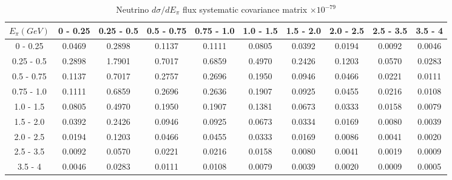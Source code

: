 \documentclass[aps,prl,twocolumn,showpacs,superscriptaddress,nofootinbib]{revtex4}
\begin{document}
\begingroup
\squeezetable
\begin{table}[h]
\tabcolsep=0.11cm
\begin{tabular}{c|ccccccccc}
$E_{\pi}(GeV)$ & 0 - 0.25 & 0.25 - 0.5 & 0.5 - 0.75 & 0.75 - 1.0 & 1.0 - 1.5 & 1.5 - 2.0 & 2.0 - 2.5 & 2.5 - 3.5 & 3.5 - 4 \\
\hline
0 - 0.25 &0.0469&	0.2898&	0.1137&	0.1111&	0.0805&	0.0392&	0.0194&	0.0092&	0.0046\\	
0.25 - 0.5& 0.2898&	1.7901&	0.7017&	0.6859&	0.4970&	0.2426&	0.1203&	0.0570&	0.0283	\\
0.5 - 0.75& 0.1137&	0.7017&	0.2757&	0.2696&	0.1950&	0.0946&	0.0466&	0.0221&	0.0111	\\
0.75 - 1.0& 0.1111&	0.6859&	0.2696&	0.2636&	0.1907&	0.0925&	0.0455&	0.0216&	0.0108	\\
1.0 - 1.5& 0.0805&	0.4970&	0.1950&	0.1907&	0.1381&	0.0673&	0.0333&	0.0158&	0.0079	\\
1.5 - 2.0& 0.0392&	0.2426&	0.0946&	0.0925&	0.0673&	0.0334&	0.0169&	0.0080&	0.0039	\\
2.0 - 2.5& 0.0194&	0.1203&	0.0466&	0.0455&	0.0333&	0.0169&	0.0086&	0.0041&	0.0020	\\
2.5 - 3.5& 0.0092&	0.0570&	0.0221&	0.0216&	0.0158&	0.0080&	0.0041&	0.0019&	0.0009	\\
3.5 - 4& 0.0046&	0.0283&	0.0111&	0.0108&	0.0079&	0.0039&	0.0020&	0.0009&	0.0005	\\
 
\end{tabular}
\caption{Neutrino $d\sigma/dE_\pi$ flux systematic covariance matrix  $\times 10^{-79}$ }
\label{tab:epi-flux}
\end{table}
\endgroup
\end{document}

